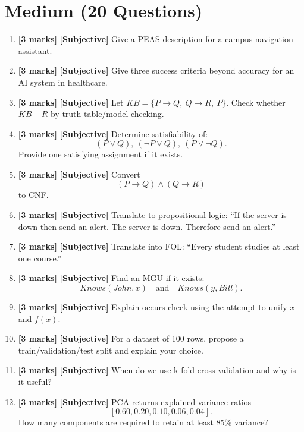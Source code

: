 \documentclass[11pt,a4paper]{article}
\newcommand{\MMarks}{\textbf{[3 marks]} }
\begin{document}
\section*{Medium (20 Questions)}
\begin{enumerate}[label=\textbf{M\arabic*.}, leftmargin=*]
  \item \MMarks \textbf{[Subjective]} Give a PEAS description for a campus navigation assistant.

  \item \MMarks \textbf{[Subjective]} Give three success criteria beyond accuracy for an AI system in healthcare.

  \item \MMarks \textbf{[Subjective]} Let $KB=\{P \rightarrow Q,\ Q \rightarrow R,\ P\}$.
    Check whether $KB \models R$ by truth table/model checking.

  \item \MMarks \textbf{[Subjective]} Determine satisfiability of:
    \[
      (P \lor Q),\ (\lnot P \lor Q),\ (P \lor \lnot Q).
    \]
    Provide one satisfying assignment if it exists.

  \item \MMarks \textbf{[Subjective]} Convert
    \[
      (P \rightarrow Q) \land (Q \rightarrow R)
    \]
    to CNF.

  \item \MMarks \textbf{[Subjective]} Translate to propositional logic:
    ``If the server is down then send an alert. The server is down. Therefore send an alert.''

  \item \MMarks \textbf{[Subjective]} Translate into FOL:
    ``Every student studies at least one course.''

  \item \MMarks \textbf{[Subjective]} Find an MGU if it exists:
    \[
      Knows(John,x) \quad \text{and} \quad Knows(y,Bill).
    \]

  \item \MMarks \textbf{[Subjective]} Explain occurs-check using the attempt to unify $x$ and $f(x)$.

  \item \MMarks \textbf{[Subjective]} For a dataset of 100 rows, propose a train/validation/test split and explain your choice.

  \item \MMarks \textbf{[Subjective]} When do we use k-fold cross-validation and why is it useful?

  \item \MMarks \textbf{[Subjective]} PCA returns explained variance ratios
    \[
      [0.60, 0.20, 0.10, 0.06, 0.04].
    \]
    How many components are required to retain at least 85\% variance?


\end{enumerate}
\end{document}
